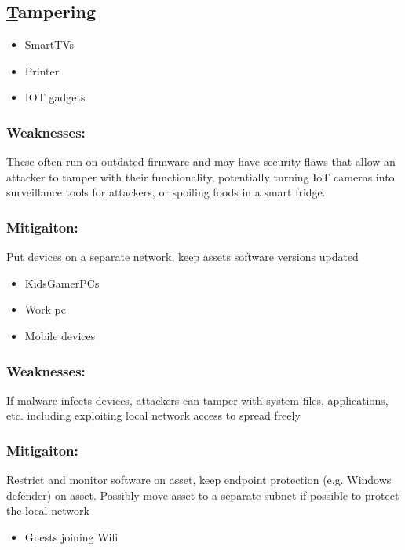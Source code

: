 \documentclass[
	letterpaper, %
	10pt, %
	unnumberedsections, %
	twoside, %
]{APAAssignment}
\begin{document}
\begin{singlespace}
\subsection{\underline{T}ampering}


	\begin{itemize}
		\item SmartTVs
		\item Printer 
		\item IOT gadgets 
	\end{itemize}
	
	\subsubsection{Weaknesses:} These often run on outdated firmware and may have security flaws that allow an attacker to tamper with their functionality, potentially turning IoT cameras into surveillance tools for attackers, or spoiling foods in a smart fridge.
	\subsubsection{Mitigaiton:} Put devices on a separate network, keep assets software versions updated
	
	\begin{itemize}
		\item KidsGamerPCs
		\item Work pc
		\item Mobile devices
	\end{itemize}
	
	\subsubsection{Weaknesses:} If malware infects devices, attackers can tamper with system files, applications, etc. including exploiting local network access to spread freely
	\subsubsection{Mitigaiton:} Restrict and monitor software on asset, keep endpoint protection (e.g. Windows defender) on asset. Possibly move asset to a separate subnet if possible to protect the local network
	
	\begin{itemize}
		\item Guests joining Wifi
	\end{itemize}
	

\end{singlespace}
\end{document}
